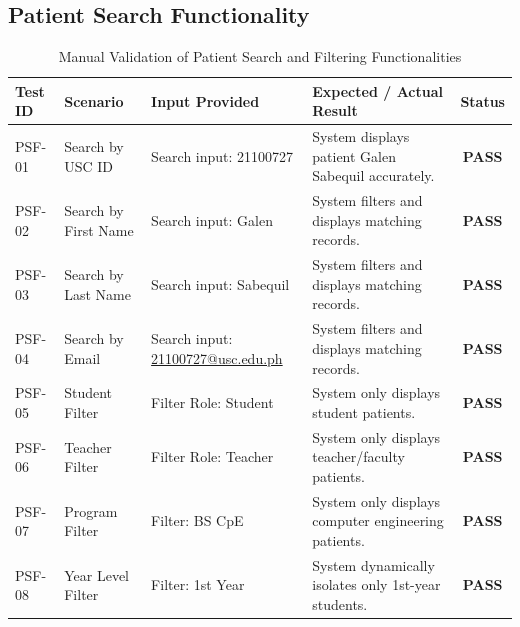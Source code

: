 \subsection{Patient Search Functionality}
\begin{table}[H]
\centering
\caption{Manual Validation of Patient Search and Filtering Functionalities}
\begin{tabularx}{\textwidth}{|l|Y|Y|Y|c|}
\hline
\textbf{Test ID} & \textbf{Scenario} & \textbf{Input Provided} & \textbf{Expected / Actual Result} & \textbf{Status} \\
\hline
PSF-01 & Search by USC ID & Search input: 21100727 & System displays patient Galen Sabequil accurately. & \textbf{PASS} \\
\hline
PSF-02 & Search by First Name & Search input: Galen & System filters and displays matching records. & \textbf{PASS} \\
\hline
PSF-03 & Search by Last Name & Search input: Sabequil & System filters and displays matching records. & \textbf{PASS} \\
\hline
PSF-04 & Search by Email & Search input: \url{21100727@usc.edu.ph} & System filters and displays matching records. & \textbf{PASS} \\
\hline
PSF-05 & Student Filter & Filter Role: Student & System only displays student patients. & \textbf{PASS} \\
\hline
PSF-06 & Teacher Filter & Filter Role: Teacher & System only displays teacher/faculty patients. & \textbf{PASS} \\
\hline
PSF-07 & Program Filter & Filter: BS CpE & System only displays computer engineering patients. & \textbf{PASS} \\
\hline
PSF-08 & Year Level Filter & Filter: 1st Year & System dynamically isolates only 1st-year students. & \textbf{PASS} \\
\hline
\end{tabularx}
\end{table}

